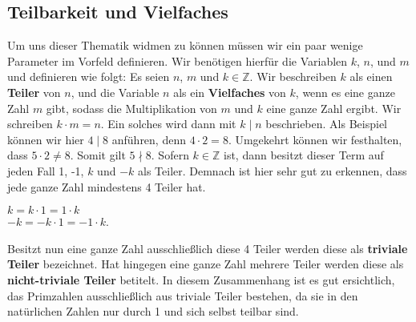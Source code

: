 \documentclass[12pt,a4paper]{article}
\theoremstyle{definition}
\begin{document}
\subsection{Teilbarkeit und Vielfaches}\label{Teilbarkeit und Vielfaches}
Um uns dieser Thematik widmen zu können müssen wir ein paar wenige Parameter im Vorfeld definieren.\newline
Wir benötigen hierfür die Variablen $k$, $n$, und $m$ und definieren wie folgt:\newline
Es seien $n$, $m$ und $k \in \mathbb{Z}$.
Wir beschreiben $k$ als einen \textbf{Teiler} von $n$, und die Variable $n$ als ein \textbf{Vielfaches} von $k$, wenn es eine ganze Zahl $m$ gibt, sodass die Multiplikation von $m$ und $k$ eine ganze Zahl ergibt.
Wir schreiben $k\cdot{m} = n$. Ein solches wird dann mit $k \mid n$ beschrieben.\newline
Als Beispiel können wir hier $4 \mid 8$ anführen, denn $4 \cdot 2 = 8$.
Umgekehrt können wir festhalten, dass $5 \cdot 2 \neq 8$. Somit gilt $5 \nmid 8.$ \newline
Sofern $k \in \mathbb{Z}$ ist, dann besitzt dieser Term auf jeden Fall 1, -1, $k$ und $-k$ als Teiler.
Demnach ist hier sehr gut zu erkennen, dass jede ganze Zahl mindestens 4 Teiler hat.
\begin{center}
$k = k \cdot 1 = 1 \cdot k$\\
$-k = -k \cdot 1 = -1 \cdot k$.
\end{center}
Besitzt nun eine ganze Zahl ausschließlich diese 4 Teiler werden diese als \textbf{triviale Teiler} bezeichnet.
Hat hingegen eine ganze Zahl mehrere Teiler werden diese als \textbf{nicht-triviale Teiler} betitelt.
In diesem Zusammenhang ist es gut ersichtlich, das Primzahlen ausschließlich aus triviale Teiler bestehen, da sie in den natürlichen Zahlen nur durch 1 und sich selbst teilbar sind. 
\end{document}
